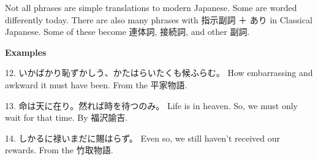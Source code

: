 \par{  Not all phrases are simple translations to modern Japanese. Some are worded differently today. There are also many phrases with 指示副詞 ＋ あり in Classical Japanese. Some of these become 連体詞, 接続詞, and other 副詞. }

\begin{center}
\textbf{Examples } 
\end{center}

\par{12. いかばかり恥ずかしう、かたはらいたくも候ふらむ。 \hfill\break
How embarrassing and awkward it must have been. \hfill\break
From the 平家物語. }

\par{13. 命は天に在り。然れば時を待つのみ。 \hfill\break
Life is in heaven. So, we must only wait for that time. \hfill\break
By 福沢諭吉. }

\par{14. しかるに禄いまだに賜はらず。 \hfill\break
Even so, we still haven't received our rewards. \hfill\break
From the 竹取物語. }
    